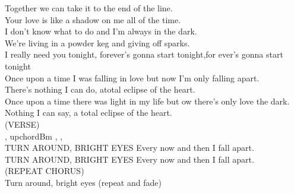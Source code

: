 Together we can take it to the end of the line.\\
Your love is like a shadow on me all of the time.\\
I don't know what to do and I'm always in the dark.\\
We're living in a powder keg and giving off sparks.\\
I really need you tonight, forever's gonna start tonight,for ever's gonna start tonight\\
Once upon a time I was falling in love but now I'm only falling apart.\\
There's nothing I can do, atotal eclipse of the heart.   \\
Once upon a time there was light in my life but ow there's only love the dark.\\
Nothing I can say, a total eclipse of the heart.\\
(VERSE)\\
  , upchord{Bm} ,  ,  \\
TURN AROUND, BRIGHT EYES Every now and then I fall apart.\\
TURN AROUND, BRIGHT EYES Every now and then I fall apart.\\
(REPEAT CHORUS)\\
Turn around, bright eyes   (repeat and fade)
